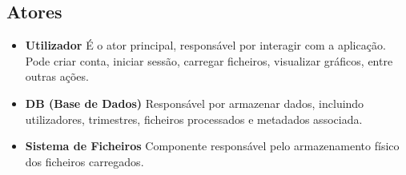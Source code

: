 \subsection{Atores}
\begin{itemize}
    \item \textbf{Utilizador} É o ator principal, responsável por interagir com a aplicação. Pode criar conta, iniciar sessão, carregar ficheiros, visualizar gráficos, entre outras ações.
    \item \textbf{DB (Base de Dados)} Responsável por armazenar dados, incluindo utilizadores, trimestres, ficheiros processados e metadados associada.
    \item \textbf{Sistema de Ficheiros} Componente responsável pelo armazenamento físico dos ficheiros carregados.
\end{itemize}

